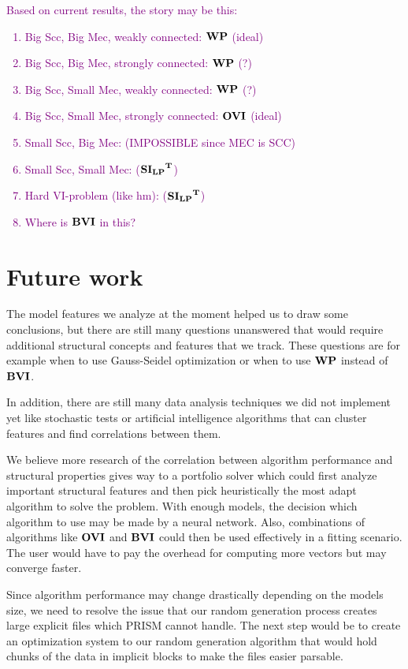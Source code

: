 \textcolor{purple}{
    Based on current results, the story may be this:
    \begin{enumerate}
        \item Big Scc, Big Mec, weakly connected: $\mathbf{WP}$ (ideal)
        \item Big Scc, Big Mec, strongly connected: $\mathbf{WP}$ (?)
        \item Big Scc, Small Mec, weakly connected: $\mathbf{WP}$ (?)
        \item Big Scc, Small Mec, strongly connected: $\mathbf{OVI}$ (ideal)
        \item Small Scc, Big Mec: (IMPOSSIBLE since MEC is SCC)
        \item Small Scc, Small Mec: ($\mathbf{\mathbf{SI_{LP}}^T}$)
        \item Hard VI-problem (like hm): ($\mathbf{\mathbf{SI_{LP}}^T}$)
        \item Where is $\mathbf{BVI}$ in this? 
    \end{enumerate}
}

\section*{Future work}
The model features we analyze at the moment helped us to draw some conclusions, but there are still many questions unanswered that would require
additional structural concepts and features that we track.
These questions are for example when to use Gauss-Seidel optimization or when to use $\mathbf{WP}$ instead of $\mathbf{BVI}$.

In addition, there are still many data analysis techniques we did not implement yet like stochastic tests or artificial intelligence algorithms
that can cluster features and find correlations between them. 

We believe more research of the correlation between algorithm performance and structural properties gives way to a portfolio solver which could first
analyze important structural features and then pick heuristically the most adapt algorithm to solve the problem.
With enough models, the decision which algorithm to use may be made by a neural network.
Also, combinations of algorithms like $\mathbf{OVI}$ and $\mathbf{BVI}$ could then be used effectively in a fitting scenario.
The user would have to pay the overhead for computing more vectors but may converge faster.

Since algorithm performance may change drastically depending on the models size,
we need to resolve the issue that our random generation process creates large explicit files which PRISM cannot handle.
The next step would be to create an optimization system to our random generation algorithm that would hold chunks of the data in 
implicit blocks to make the files easier parsable.

